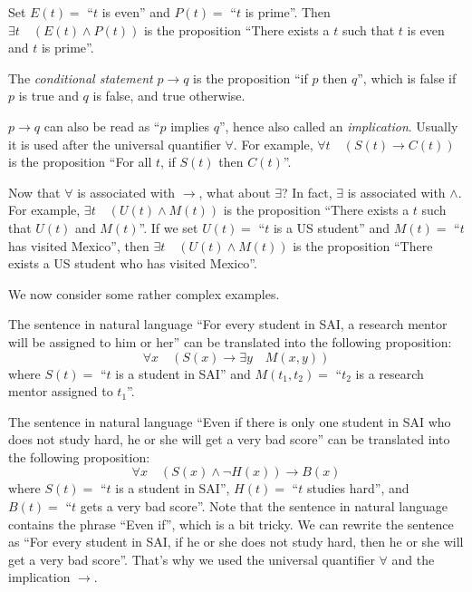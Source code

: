 \begin{example}
    Set $E(t)=$ ``$t$ is even'' and $P(t)=$ ``$t$ is prime''. Then $\exists t\quad (E(t) \wedge P(t))$ is the proposition ``There exists a $t$ such that $t$ is even and $t$ is prime''.
\end{example}

\begin{definition}
    The \emph{conditional statement} $p \rightarrow q$ is the proposition ``if $p$ then $q$'', which is false if $p$ is true and $q$ is false, and true otherwise.
\end{definition}

$p \rightarrow q$ can also be read as ``$p$ implies $q$'', hence also called an \emph{implication}. Usually it is used after the universal quantifier $\forall$. For example, $\forall t\quad (S(t) \rightarrow C(t))$ is the proposition ``For all $t$, if $S(t)$ then $C(t)$''. 

Now that $\forall$ is associated with $\rightarrow$, what about $\exists$? In fact, $\exists$ is associated with $\wedge$. For example, $\exists t\quad (U(t) \wedge M(t))$ is the proposition ``There exists a $t$ such that $U(t)$ and $M(t)$''. If we set $U(t)=$ ``$t$ is a US student'' and $M(t)=$ ``$t$ has visited Mexico'', then $\exists t\quad (U(t) \wedge M(t))$ is the proposition ``There exists a US student who has visited Mexico''.

We now consider some rather complex examples. 

\begin{example}
    The sentence in natural language ``For every student in SAI, a research mentor will be assigned to him or her'' can be translated into the following proposition:
    \[\forall x\quad (S(x) \rightarrow \exists y\quad M(x, y))\]
    where $S(t)=$ ``$t$ is a student in SAI'' and $M(t_1, t_2)=$ ``$t_2$ is a research mentor assigned to $t_1$''.

    The sentence in natural language ``Even if there is only one student in SAI who does not study hard, he or she will get a very bad score'' can be translated into the following proposition:
    \[\forall x\quad (S(x) \wedge \neg H(x)) \rightarrow B(x)\]
    where $S(t)=$ ``$t$ is a student in SAI'', $H(t)=$ ``$t$ studies hard'', and $B(t)=$ ``$t$ gets a very bad score''. Note that the sentence in natural language contains the phrase ``Even if'', which is a bit tricky. We can rewrite the sentence as ``For every student in SAI, if he or she does not study hard, then he or she will get a very bad score''. That's why we used the universal quantifier $\forall$ and the implication $\rightarrow$.
\end{example}

